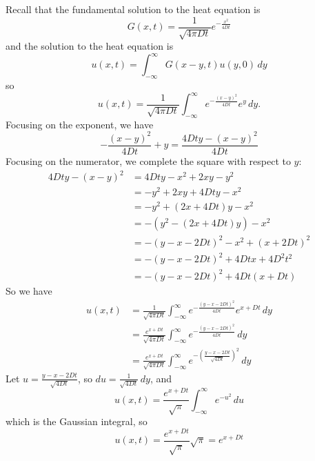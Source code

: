 \documentclass[plain]{pset}
\begin{document}
\begin{solution}
    Recall that the fundamental solution to the heat equation is
    \[G(x, t) = \frac{1}{\sqrt{4\pi Dt}}e^{-\frac{x^2}{4Dt}}\]
    and the solution to the heat equation is
    \[u(x, t) = \int_{-\infty}^{\infty} G(x - y, t)u(y, 0)\,dy\]
    so
    \[u(x, t) = \frac{1}{\sqrt{4\pi Dt}} \int_{-\infty}^{\infty} e^{-\frac{{(x - y)}^2}{4Dt}}e^y\,dy.\]
    Focusing on the exponent, we have
    \[-\frac{{(x - y)}^2}{4Dt} + y = \frac{4Dty - {(x - y)}^2}{4Dt}\]
    Focusing on the numerator, we complete the square with respect to \(y\):
    \begin{align*}
        4Dty - {(x - y)}^2 & = 4Dty - x^2 + 2xy - y^2                  \\
                           & = -y^2 + 2xy + 4Dty - x^2                 \\
                           & = -y^2 + (2x + 4Dt)y - x^2                \\
                           & = -\left(y^2 - (2x + 4Dt)y\right) - x^2   \\
                           & = -{(y - x -2Dt)}^2 - x^2 + {(x + 2Dt)}^2 \\
                           & = -{(y - x - 2Dt)}^2 + 4Dtx + 4D^2t^2     \\
                           & = -{(y - x - 2Dt)}^2 + 4Dt(x + Dt)
    \end{align*}
    So we have
    \begin{align*}
        u(x, t) & = \frac{1}{\sqrt{4\pi Dt}} \int_{-\infty}^{\infty} e^{-\frac{{(y - x - 2Dt)}^2}{4Dt}}e^{x + Dt}\,dy                  \\
                & = \frac{e^{x + Dt}}{\sqrt{4\pi Dt}} \int_{-\infty}^{\infty} e^{-\frac{{(y - x - 2Dt)}^2}{4Dt}}\,dy                   \\
                & = \frac{e^{x + Dt}}{\sqrt{4\pi Dt}} \int_{-\infty}^{\infty} e^{-{\left(\frac{y - x - 2Dt}{\sqrt{4Dt}}\right)}^2}\,dy
    \end{align*}
    Let \(u = \frac{y - x - 2Dt}{\sqrt{4Dt}}\), so \(du = \frac{1}{\sqrt{4Dt}}\,dy\), and
    \[u(x, t) = \frac{e^{x + Dt}}{\sqrt{\pi}} \int_{-\infty}^{\infty} e^{-u^2}\,du\]
    which is the Gaussian integral, so
    \[u(x, t) = \frac{e^{x + Dt}}{\sqrt{\pi}} \sqrt{\pi} = e^{x + Dt}\]

\end{solution}

\pagebreak
\end{document}
